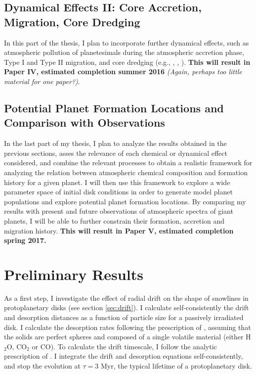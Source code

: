 \documentclass[manuscript]{aastex}
\begin{document}
\subsection{Dynamical Effects II: Core Accretion, Migration, Core Dredging}

In this part of the thesis, I plan to incorporate further dynamical effects, such as atmospheric pollution of planetesimals during the atmospheric accretion phase, Type I and Type II migration, and core dredging (e.g., \citealt{lodders09}, \citealt{stevenson85}, \citealt{guillot04}). \textbf{This will result in Paper IV, estimated completion summer 2016} \textit{(Again, perhaps too little material for one paper?)}.

\subsection{Potential Planet Formation Locations and Comparison with Observations}

In the last part of my thesis, I plan to analyze the results obtained in the previous sections, asses the relevance of each chemical or dynamical effect considered, and combine the relevant processes to obtain a realistic framework for analyzing the relation between atmospheric chemical composition and  formation history for a given planet. I will then use this framework to explore a wide parameter space of initial disk conditions in order to generate model planet populations and explore potential planet formation locations. By comparing my results with present and future observations of atmospheric spectra of giant planets, I will be able to further constrain their formation, accretion and migration history. \textbf{This will result in Paper V, estimated completion spring 2017.}

\section{Preliminary Results}

As a first step, I investigate the effect of radial drift on the shape of snowlines in protoplanetary disks (see section \ref{sec:drift}). I calculate self-consistently the drift and desorption distances as a function of particle size for a passively irradiated disk. I calculate the desorption rates following the prescription of \citet{hollenbach09}, assuming that the solids are perfect spheres and composed of a single volatile material (either H$_2$O, CO$_2$ or CO). To calculate the drift timescale, I follow the analytic prescription of \citet{chiang10}. I integrate the drift and desorption equations self-consistently, and stop the evolution at $\tau=3$ Myr, the typical lifetime of a protoplanetary disk. 
\end{document}
